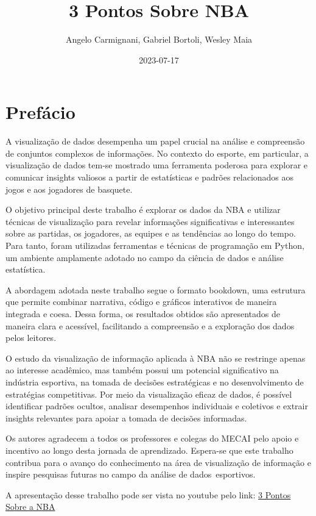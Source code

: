 \documentclass[
]{book}
\title{3 Pontos Sobre NBA}
\author{Angelo Carmignani, Gabriel Bortoli, Wesley Maia}
\date{2023-07-17}
\begin{document}
\maketitle

{
\setcounter{tocdepth}{1}
\tableofcontents
}
\hypertarget{prefuxe1cio}{%
\chapter*{Prefácio}\label{prefuxe1cio}}

A visualização de dados desempenha um papel crucial na análise e compreensão de conjuntos complexos de informações. No contexto do esporte, em particular, a visualização de dados tem-se mostrado uma ferramenta poderosa para explorar e comunicar insights valiosos a partir de estatísticas e padrões relacionados aos jogos e aos jogadores de basquete.

O objetivo principal deste trabalho é explorar os dados da NBA e utilizar técnicas de visualização para revelar informações significativas e interessantes sobre as partidas, os jogadores, as equipes e as tendências ao longo do tempo. Para tanto, foram utilizadas ferramentas e técnicas de programação em Python, um ambiente amplamente adotado no campo da ciência de dados e análise estatística.

A abordagem adotada neste trabalho segue o formato bookdown, uma estrutura que permite combinar narrativa, código e gráficos interativos de maneira integrada e coesa. Dessa forma, os resultados obtidos são apresentados de maneira clara e acessível, facilitando a compreensão e a exploração dos dados pelos leitores.

O estudo da visualização de informação aplicada à NBA não se restringe apenas ao interesse acadêmico, mas também possui um potencial significativo na indústria esportiva, na tomada de decisões estratégicas e no desenvolvimento de estratégias competitivas. Por meio da visualização eficaz de dados, é possível identificar padrões ocultos, analisar desempenhos individuais e coletivos e extrair insights relevantes para apoiar a tomada de decisões informadas.

Os autores agradecem a todos os professores e colegas do MECAI pelo apoio e incentivo ao longo desta jornada de aprendizado. Espera-se que este trabalho contribua para o avanço do conhecimento na área de visualização de informação e inspire pesquisas futuras no campo da análise de dados~esportivos.

A apresentação desse trabalho pode ser vista no youtube pelo link: \href{https://www.youtube.com/watch?v=cuoEVbSLOLg\&feature=youtu.be}{3 Pontos Sobre a NBA}
\end{document}
